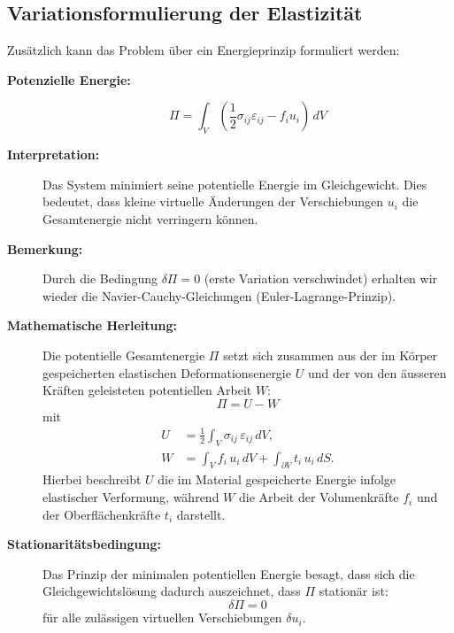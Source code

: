 \subsection{Variationsformulierung der Elastizität}
Zusätzlich kann das Problem über ein Energieprinzip formuliert werden:

\begin{description}
	\item[\textbf{Potenzielle Energie:}]
	\begin{equation*}
		\Pi = \int_V \left( \frac{1}{2} \sigma_{ij} \varepsilon_{ij} - f_i u_i \right) \, dV
	\end{equation*}
	
	\item[\textbf{Interpretation:}] 
	Das System minimiert seine potentielle Energie im Gleichgewicht. 
	Dies bedeutet, dass kleine virtuelle Änderungen der Verschiebungen $u_i$ die Gesamtenergie nicht verringern können.
	
	\item[\textbf{Bemerkung:}] 
	Durch die Bedingung $\delta \Pi = 0$ (erste Variation verschwindet) erhalten wir wieder die Navier-Cauchy-Gleichungen (Euler-Lagrange-Prinzip).
	
	\item[\textbf{Mathematische Herleitung:}] 
	Die potentielle Gesamtenergie $\Pi$ setzt sich zusammen aus der im Körper gespeicherten elastischen Deformationsenergie $U$ und der von den äusseren Kräften geleisteten potentiellen Arbeit $W$:
	\begin{equation*}
		\Pi = U - W
	\end{equation*}
	mit
	\begin{align*}
		U &= \frac{1}{2} \int_V \sigma_{ij} \, \varepsilon_{ij} \, dV, \\
		W &= \int_V f_i \, u_i \, dV + \int_{\partial V} t_i \, u_i \, dS.
	\end{align*}
	Hierbei beschreibt $U$ die im Material gespeicherte Energie infolge elastischer Verformung, während $W$ die Arbeit der Volumenkräfte $f_i$ und der Oberflächenkräfte $t_i$ darstellt.
	
	\item[\textbf{Stationaritätsbedingung:}]
	Das Prinzip der minimalen potentiellen Energie besagt, dass sich die Gleichgewichtslösung dadurch auszeichnet, dass $\Pi$ stationär ist:
	\begin{equation*}
		\delta \Pi = 0
	\end{equation*}
	für alle zulässigen virtuellen Verschiebungen $\delta u_i$.
	

\end{description}
